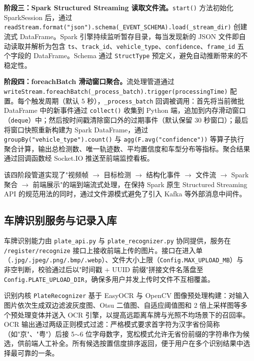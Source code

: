 \documentclass{wzuthesis} %
\begin{document}
\textbf{阶段三：Spark Structured Streaming 读取文件流。}\texttt{start()} 方法初始化 SparkSession 后，通过 \nolinkurl{readStream.format("json").schema(_EVENT_SCHEMA).load(_stream_dir)} 创建流式 DataFrame。Spark 引擎持续监听暂存目录，每当发现新的 JSON 文件即自动读取并解析为包含 \texttt{ts}、\texttt{track\_id}、\texttt{vehicle\_type}、\texttt{confidence}、\texttt{frame\_id} 五个字段的 DataFrame。Schema 通过 \texttt{StructType} 预定义，避免自动推断带来的不稳定性。

\textbf{阶段四：foreachBatch 滑动窗口聚合。}流处理管道通过 \nolinkurl{writeStream.foreachBatch(_process_batch).trigger(processingTime)} 配置。每个触发周期（默认 5 秒），\texttt{\_process\_batch} 回调被调用：首先将当前微批 DataFrame 中的新事件通过 \texttt{collect()} 收集到 Python 端，追加到内存滑动窗口（\texttt{deque}）中；然后按时间戳清除窗口外的过期事件（默认保留 30 秒窗口）；最后将窗口快照重新构建为 Spark DataFrame，通过 \texttt{groupBy("vehicle\_type").count()} 与 \texttt{agg(F.avg("confidence"))} 等算子执行聚合计算，输出总检测数、唯一轨迹数、平均置信度和车型分布等指标。聚合结果通过回调函数经 Socket.IO 推送至前端监控看板。

该四阶段管道实现了"视频帧 $\rightarrow$ 目标检测 $\rightarrow$ 结构化事件 $\rightarrow$ 文件流 $\rightarrow$ Spark 聚合 $\rightarrow$ 前端展示"的端到端流式处理，在保持 Spark 原生 Structured Streaming API 的规范用法的同时，通过文件源模式避免了引入 Kafka 等外部消息中间件。

\subsection{车牌识别服务与记录入库}

车牌识别能力由 \texttt{plate\_api.py} 与 \texttt{plate\_recognizer.py} 协同提供，服务在 \nolinkurl{/register/recognize} 接口上接收前端上传的图片。接口在进入单（\nolinkurl{.jpg/.jpeg/.png/.bmp/.webp}）、文件大小上限（\texttt{Config.MAX\_UPLOAD\_MB}）与非空判断，校验通过后以"时间戳 + UUID 前缀"拼接文件名落盘至 \texttt{Config.PLATE\_UPLOAD\_DIR}，确保多用户并发上传时文件不互相覆盖。

识别内核 \texttt{PlateRecognizer} 基于 EasyOCR 与 OpenCV 图像预处理构建：对输入图片依次生成双边滤波灰度图、Otsu 二值图、自适应阈值图和 2 倍上采样图等多个预处理变体并送入 OCR 引擎，以提高远距离车牌与光照不均场景下的召回率。OCR 输出通过两级正则模式过滤：严格模式要求首字符为汉字省份简称（如"京"、"粤"）后接 5$\sim$6 位字母数字，宽松模式允许无省份前缀的字符串作为候选，供前端人工补全。所有候选按置信度排序返回，便于用户在多个识别结果中选择最可靠的一条。
\end{document}
